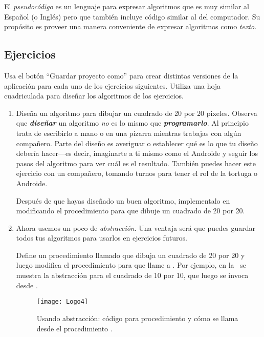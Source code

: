 El \emph{pseudocódigo} es un lenguaje para expresar algoritmos que es
muy similar al Español (o Inglés) pero que también incluye código
similar al del computador. Su propósito es proveer una manera
conveniente de expresar algoritmos como \emph{texto}.

\subsection*{Ejercicios}

Usa el botón ``Guardar proyecto como'' para crear distintas versiones
de la aplicación para cada uno de los ejercicios siguientes. Utiliza
una hoja cuadriculada para diseñar los algoritmos de los ejercicios.

\begin{enumerate}

\item Diseña un algoritmo para dibujar un cuadrado de 20 por 20
  pixeles. Observa que \textbf{\textit{diseñar}} un algoritmo
  \emph{no} es lo mismo que \textbf{\textit{programarlo}}. Al
  principio trata de escribirlo a mano o en una pizarra mientras
  trabajas con algún compañero. Parte del diseño es averiguar o
  establecer qué es lo que tu diseño debería hacer---es decir,
  imaginarte a ti mismo como el Androide y seguir los pasos del
  algoritmo para ver cuál es el resultado. También puedes hacer este
  ejercicio con un compañero, tomando turnos para tener el rol de la
  tortuga o Androide.

  Después de que hayas diseñado un buen algoritmo, implementalo en
  \AppInventor modificando el procedimiento  para
  que dibuje un cuadrado de 20 por 20.

\item Ahora usemos un poco de \emph{abstracción}. Una ventaja será que
  puedes guardar todos tus algoritmos para usarlos en ejercicios
  futuros.

  Define un procedimiento llamado  que dibuja un
  cuadrado de 20 por 20 y luego modifica el procedimiento
   para que llame a . Por ejemplo, en
  la~ se muestra la abstracción para el cuadrado de 10
  por 10, que luego se invoca desde .

\begin{figure}[H]
  \centering
  \texttt{[image: Logo4]}
  \caption{Usando abstracción: código para procedimiento
     y cómo se llama desde el procedimiento
    .}
  \label{fig:Logo4}
\end{figure}


\end{enumerate}
